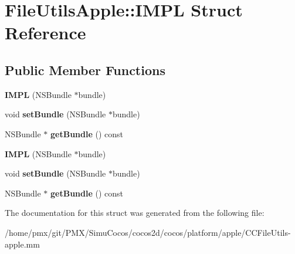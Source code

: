 \hypertarget{structFileUtilsApple_1_1IMPL}{}\section{File\+Utils\+Apple\+:\+:I\+M\+PL Struct Reference}
\label{structFileUtilsApple_1_1IMPL}
\subsection*{Public Member Functions}
\begin{DoxyCompactItemize}
\item 
\mbox{\label{structFileUtilsApple_1_1IMPL_a5e531c24867a426e7c765dc89eb49a60}} 
{\bfseries I\+M\+PL} (N\+S\+Bundle $\ast$bundle)
\item 
\mbox{\label{structFileUtilsApple_1_1IMPL_a943a9ae99f49a93cb400ec2f2c3a5b83}} 
void {\bfseries set\+Bundle} (N\+S\+Bundle $\ast$bundle)
\item 
\mbox{\label{structFileUtilsApple_1_1IMPL_a09b08d18375f97448662794acd2b2187}} 
N\+S\+Bundle $\ast$ {\bfseries get\+Bundle} () const
\item 
\mbox{\label{structFileUtilsApple_1_1IMPL_a5e531c24867a426e7c765dc89eb49a60}} 
{\bfseries I\+M\+PL} (N\+S\+Bundle $\ast$bundle)
\item 
\mbox{\label{structFileUtilsApple_1_1IMPL_a943a9ae99f49a93cb400ec2f2c3a5b83}} 
void {\bfseries set\+Bundle} (N\+S\+Bundle $\ast$bundle)
\item 
\mbox{\label{structFileUtilsApple_1_1IMPL_a09b08d18375f97448662794acd2b2187}} 
N\+S\+Bundle $\ast$ {\bfseries get\+Bundle} () const
\end{DoxyCompactItemize}


The documentation for this struct was generated from the following file\+:\begin{DoxyCompactItemize}
\item 
/home/pmx/git/\+P\+M\+X/\+Simu\+Cocos/cocos2d/cocos/platform/apple/C\+C\+File\+Utils-\/apple.\+mm\end{DoxyCompactItemize}

